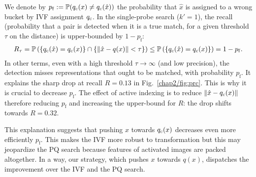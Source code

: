 We denote by $p_\mathrm{f} := \mathbb{P}(q_\mathrm{c}(x) \neq q_\mathrm{c} (\hat{x}) )$ the probability that $\hat{x}$ is assigned to a wrong bucket by IVF assignment $q_\mathrm{c}$.
In the single-probe search ($k'=1$), the recall (probability that a pair is detected when it is a true match, for a given threshold $\tau$ on the distance) is upper-bounded by $1 - p_\mathrm{f}$:
\begin{align}
   R_\tau 
   = \mathbb{P} \left(\{ q_\mathrm{c}(\hat{x}) = q_\mathrm{c}(x) \} \cap \{ \| \hat{x}-q(x)\| < \tau \} \right) 
   \leq \mathbb{P} \left(\{ q_\mathrm{c}(\hat{x}) = q_\mathrm{c}(x) \}  \right) 
   =1 - p_\mathrm{f}.
\end{align}
In other terms, even with a high threshold $\tau \rightarrow \infty$ (and low precision), the detection misses representations that ought to be matched, with probability $p_\mathrm{f}$. It explains the sharp drop at recall $R=0.13$ in Fig.~\ref{chap2/fig:prc}.
This is why it is crucial to decrease $p_\mathrm{f}$.
The effect of active indexing is to reduce $\|\hat{x}-q_\mathrm{c}(x)\|$
therefore reducing $p_\mathrm{f}$ and increasing the upper-bound for $R$:
the drop shifts towards $R=0.32$. 

This explanation suggests that pushing $x$ towards $q_\mathrm{c}(x)$ decreases even more efficiently $p_\mathrm{f}$. 
This makes the IVF more robust to transformation but this may jeopardize the PQ search because features of activated images are packed altogether.
In a way, our strategy, which pushes $x$ towards $q(x)$, dispatches the improvement over the IVF and the PQ search.





